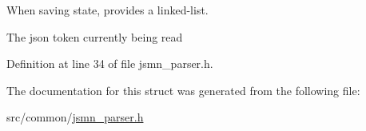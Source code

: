 When saving state, provides a linked-\/list. 

The json token currently being read 

Definition at line 34 of file jsmn\-\_\-parser.\-h.



The documentation for this struct was generated from the following file\-:\begin{DoxyCompactItemize}
\item 
src/common/\hyperlink{jsmn__parser_8h}{jsmn\-\_\-parser.\-h}\end{DoxyCompactItemize}
